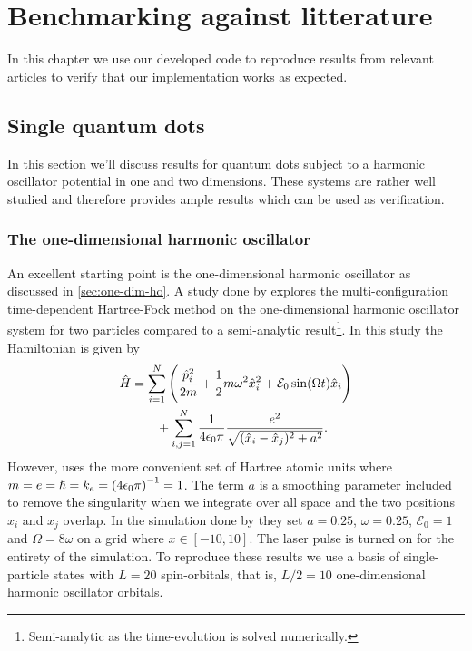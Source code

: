 \chapter{Benchmarking against litterature}
    In this chapter we use our developed code to reproduce results from relevant
    articles to verify that our implementation works as expected.

    \section{Single quantum dots}
        In this section we'll discuss results for quantum dots subject to a
        harmonic oscillator potential in one and two dimensions.
        These systems are rather well studied and therefore provides ample
        results which can be used as verification.

        \subsection{The one-dimensional harmonic oscillator}
            An excellent starting point is the one-dimensional harmonic
            oscillator as discussed in \autoref{sec:one-dim-ho}.
            A study done by \citeauthor{zanghellini_2004}
            \cite{zanghellini_2004, skattum2013time, kristiansen2017time}
            explores the multi-configuration time-dependent Hartree-Fock method
            on the one-dimensional harmonic oscillator system for two particles
            compared to a semi-analytic result\footnote{Semi-analytic as the
            time-evolution is solved numerically.}.
            In this study the Hamiltonian is given by
            \begin{align}
                \hat{H}
                &=
                \sum_{i = 1}^{N}
                \left( 
                    \frac{\hat{p}^2_i}{2m}
                    + \frac{1}{2} m \omega^2 \hat{x}^2_i
                    + \mathcal{E}_0 \sin(\Omega t)\hat{x}_i
                 \right)
                \nonumber \\
                &\qquad
                + \sum_{i, j = 1}^{N}
                \frac{1}{4\epsilon_0\pi}
                \frac{e^2}{\sqrt{(\hat{x}_i - \hat{x}_j)^2 + a^2}}.
            \end{align}
            However, \citeauthor{zanghellini_2004} uses the more convenient set
            of Hartree atomic units where $m = e = \hslash = k_e =
            \left( 4\epsilon_0\pi \right)^{-1} = 1$.
            The term $a$ is a smoothing parameter included to remove the
            singularity when we integrate over all space and the two positions
            $x_i$ and $x_j$ overlap. \cite{suq, zanghellini_2004}
            In the simulation done by \citeauthor{zanghellini_2004} they set $a
            = 0.25$, $\omega = 0.25$, $\mathcal{E}_0 = 1$ and $\Omega = 8\omega$
            on a grid where $x \in [-10, 10]$.
            The laser pulse is turned on for the entirety of the simulation.
            To reproduce these results we use a basis of single-particle states
            with $L = 20$ spin-orbitals, that is, $L / 2 = 10$ one-dimensional
            harmonic oscillator orbitals.

